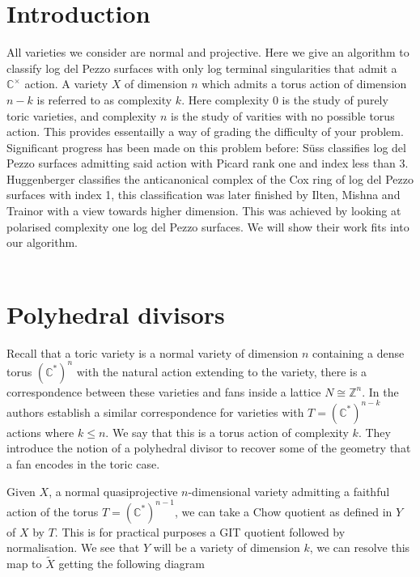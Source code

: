 \documentclass[12pt,a4paper]{book}      %
\theoremstyle{definition}
\newcommand{\C}[1]{(\mathbb{C}^*)^#1}
\begin{document}
\section{Introduction}

All varieties we consider are normal and projective. Here we give an algorithm to classify log del Pezzo surfaces  with only log terminal singularities that admit a $\mathbb{C}^\times$ action. A variety $X$ of dimension $n$ which admits a torus action of dimension $n-k$ is referred to as complexity $k$. Here complexity 0 is the study of purely toric varieties, and complexity $n$ is the study of varities with no possible torus action. This provides essentailly a way of grading the difficulty of your problem. Significant progress has been made on this problem before: S\"{u}ss \cite{Suss} classifies log del Pezzo surfaces admitting said action with Picard rank one and index less than 3. Huggenberger \cite{Huggenberger} classifies the anticanonical complex of the Cox ring of log del Pezzo surfaces with index 1, this classification was later finished by Ilten, Mishna and Trainor \cite{IMT} with a view towards higher dimension. This was achieved by looking at polarised complexity one log del Pezzo surfaces. We will show their work fits into our algorithm. 
\\
\\
\section{Polyhedral divisors}
Recall that a toric variety is a  normal variety of dimension $n$ containing a dense torus $\C{n}$ with the natural action extending to the variety, there is a correspondence between these varieties and fans inside a lattice $N \cong \mathbb{Z}^n$.
In \cite{AltHau} the authors establish a similar correspondence for varieties with $T = \C{{ n-k}}$ actions where $k \leq n$. We say that this is a torus action of complexity $k$. They introduce the notion of a polyhedral divisor to recover some of the geometry that a fan encodes in the toric case. 


Given $X$, a normal quasiprojective $n$-dimensional variety admitting a faithful action of the torus $ T = (\mathbb{C}^*)^{n-1}$, we can take a Chow quotient as defined in \cite{AltHau} $Y$ of $X$ by $T$. This is for practical purposes a GIT quotient followed by normalisation.  We see that $Y$ will be a variety of dimension $k$, we can resolve this map to $\tilde{X}$ getting the following diagram
\end{document}
